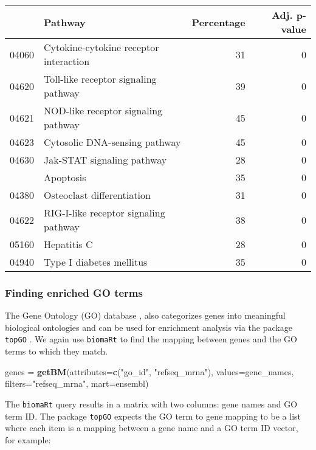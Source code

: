 \documentclass[9pt,a4paper,]{extarticle}
\newenvironment{Shaded}{\begin{snugshade}}{\end{snugshade}}
\newcommand{\DataTypeTok}[1]{\textcolor[rgb]{0.13,0.29,0.53}{#1}}
\newcommand{\KeywordTok}[1]{\textcolor[rgb]{0.13,0.29,0.53}{\textbf{#1}}}
\newcommand{\NormalTok}[1]{#1}
\newcommand{\StringTok}[1]{\textcolor[rgb]{0.31,0.60,0.02}{#1}}
\begin{document}
\begin{tabular}{llrr}
\toprule
  & Pathway & Percentage & Adj. p-value\\
\midrule
04060 & Cytokine-cytokine receptor interaction & 31 & 0\\
04620 & Toll-like receptor signaling pathway & 39 & 0\\
04621 & NOD-like receptor signaling pathway & 45 & 0\\
04623 & Cytosolic DNA-sensing pathway & 45 & 0\\
04630 & Jak-STAT signaling pathway & 28 & 0\\
\addlinespace
04210 & Apoptosis & 35 & 0\\
04380 & Osteoclast differentiation & 31 & 0\\
04622 & RIG-I-like receptor signaling pathway & 38 & 0\\
05160 & Hepatitis C & 28 & 0\\
04940 & Type I diabetes mellitus & 35 & 0\\
\bottomrule
\end{tabular}

\hypertarget{finding-enriched-go-terms}{%
\subsubsection{Finding enriched GO terms}\label{finding-enriched-go-terms}}

The Gene Ontology (GO) database \citep{GO}, also categorizes genes into meaningful
biological ontologies and can be used for enrichment analysis via the package
\texttt{topGO} \citep{alexa:topgo}. We again use \texttt{biomaRt} to find the mapping between
genes and the GO terms to which they match.

\begin{Shaded}
\begin{Highlighting}[]
\NormalTok{genes =}\StringTok{ }\KeywordTok{getBM}\NormalTok{(}\DataTypeTok{attributes=}\KeywordTok{c}\NormalTok{(}\StringTok{"go_id"}\NormalTok{, }\StringTok{"refseq_mrna"}\NormalTok{),}
          \DataTypeTok{values=}\NormalTok{gene_names,}
          \DataTypeTok{filters=}\StringTok{"refseq_mrna"}\NormalTok{,}
          \DataTypeTok{mart=}\NormalTok{ensembl)}
\end{Highlighting}
\end{Shaded}

The \texttt{biomaRt} query results in a matrix with two columns: gene names and GO
term ID. The package \texttt{topGO} \citep{alexa:topgo} expects the GO term to gene
mapping to be a list where each item is a mapping between a gene name and a GO
term ID vector, for example:
\end{document}
